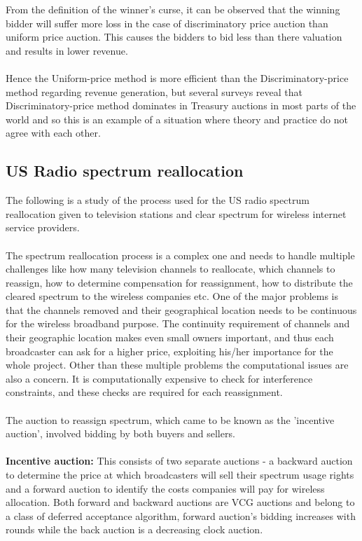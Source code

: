 \documentclass[a4paper]{article}
\begin{document}
From the definition of the winner's curse, it can be observed that the winning bidder will suffer more loss in the case of discriminatory price auction than uniform price auction. This causes the bidders to bid less than there valuation and results in lower revenue.
\\\\
Hence the Uniform-price method is more efficient than the Discriminatory-price method regarding revenue generation, but several surveys reveal that Discriminatory-price method dominates in Treasury auctions in most parts of the world and so this is an example of a situation where theory and practice do not agree with each other.

\pagebreak
\subsection*{US Radio spectrum reallocation}

The following is a study of the process used for the US radio spectrum reallocation given to television stations and clear spectrum for wireless internet service providers.
\\\\
The spectrum reallocation process is a complex one and needs to handle multiple challenges like how many television channels to reallocate, which channels to reassign, how to determine compensation for reassignment, how to distribute the cleared spectrum to the wireless companies etc. One of the major problems is that the channels removed and their geographical location needs to be continuous for the wireless broadband purpose. The continuity requirement of channels and their geographic location makes even small owners important, and thus each broadcaster can ask for a higher price, exploiting his/her importance for the whole project. Other than these multiple problems the computational issues are also a concern. It is computationally expensive to check for interference constraints, and these checks are required for each reassignment.
\\\\
The auction to reassign spectrum, which came to be known as the 'incentive auction', involved bidding by both buyers and sellers.
\\\\
\textbf{Incentive auction:} This consists of two separate auctions - a backward auction to determine the price at which broadcasters will sell their spectrum usage rights and a forward auction to identify the costs companies will pay for wireless allocation. Both forward and backward auctions are VCG auctions and belong to a class of deferred acceptance algorithm, forward auction's bidding increases with rounds while the back auction is a decreasing clock auction.
\end{document}
